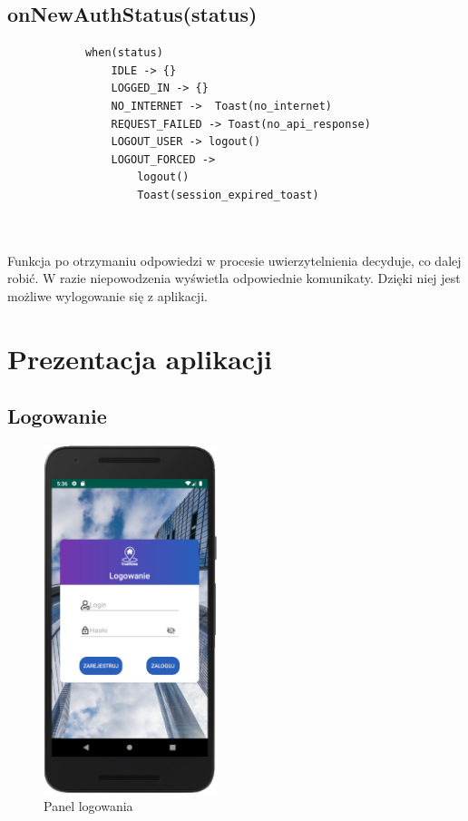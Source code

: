 \documentclass[polish, 11pt]{article}
\begin{document}
    \subsection{onNewAuthStatus(status)}
        \begin{lstlisting}
            when(status)
                IDLE -> {}
                LOGGED_IN -> {}
                NO_INTERNET ->  Toast(no_internet)
                REQUEST_FAILED -> Toast(no_api_response)
                LOGOUT_USER -> logout()
                LOGOUT_FORCED -> 
                    logout()
                    Toast(session_expired_toast)
              
            
        \end{lstlisting}
        Funkcja po otrzymaniu odpowiedzi w procesie uwierzytelnienia decyduje, co dalej robić. W razie niepowodzenia wyświetla odpowiednie komunikaty. Dzięki niej jest możliwe wylogowanie się z aplikacji.

\section{Prezentacja aplikacji}

    \subsection{Logowanie}
        \begin{figure}[H]
                    \centering
                    \includegraphics[width=0.45\textwidth]{aplikacja/logowanie.png}
                    \caption{Panel logowania}
        \end{figure}
        
\end{document}
